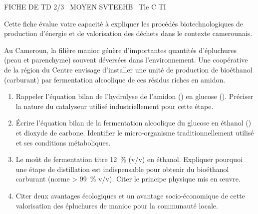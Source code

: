 \documentclass[11pt]{article}
\begin{document}
\begin{tcolorbox}[enhanced,colback=popink,colframe=popink,arc=10pt,boxrule=0pt,left=12pt,right=12pt,top=9pt,bottom=9pt]
{\color{white}\popxbold\small FICHE DE TD 2/3 \textbullet\ MOYEN \hfill SVTEEHB \textbullet\ Tle C TI\par}
\end{tcolorbox}
\vspace{4pt}
\noindent Cette fiche évalue votre capacité à expliquer les procédés biotechnologiques de production d'énergie et de valorisation des déchets dans le contexte camerounais.

\begin{exercice}
Au Cameroun, la filière manioc génère d'importantes quantités d'épluchures (peau et parenchyme) souvent déversées dans l'environnement. Une coopérative de la région du Centre envisage d'installer une unité de production de bioéthanol (carburant) par fermentation alcoolique de ces résidus riches en amidon.
\begin{enumerate}
    \item Rappeler l'équation bilan de l'hydrolyse de l'amidon () en glucose (). Préciser la nature du catalyseur utilisé industriellement pour cette étape.
    \item Écrire l'équation bilan de la fermentation alcoolique du glucose en éthanol () et dioxyde de carbone. Identifier le micro-organisme traditionnellement utilisé et ses conditions métaboliques.
    \item Le moût de fermentation titre \SI{12}{\%} (v/v) en éthanol. Expliquer pourquoi une étape de distillation est indispensable pour obtenir du bioéthanol carburant (norme > \SI{99}{\%} v/v). Citer le principe physique mis en œuvre.
    \item Citer deux avantages écologiques et un avantage socio-économique de cette valorisation des épluchures de manioc pour la communauté locale.
\end{enumerate}
\end{exercice}
\end{document}
